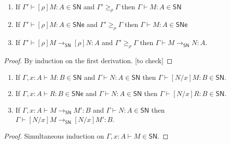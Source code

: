 \documentclass{article}
\newcommand{\ext}[1]{\geq_{#1}}
\newcommand{\SN}{\mathsf{SN}}
\newcommand{\SNe}{\mathsf{SNe}}
\newcommand{\redSN}{\longrightarrow_\SN}
\begin{document}
\begin{lemma}~\label{lm:anti-renameSN}
  \begin{enumerate}
  \item If $\Gamma' \vdash [\rho]M : A \in \SN$ and $\Gamma' \ext{\rho} \Gamma$ then $\Gamma \vdash M : A \in \SN$
  \item If $\Gamma' \vdash [\rho]M : A \in \SNe$ and $\Gamma' \ext{\rho} \Gamma$ then $\Gamma \vdash M : A \in \SNe$
  \item If $\Gamma' \vdash [\rho]M \redSN [\rho]N : A$ and $\Gamma' \ext{\rho} \Gamma$ then $\Gamma \vdash M \redSN N : A$.
  \end{enumerate}
\end{lemma}
\begin{proof}
By induction on the first derivation. [to check]
\end{proof}


\begin{lemma}\label{lem:SNsubst}\quad
  \begin{enumerate}
  \item If $\Gamma, x{:}A \vdash M : B \in \SN$ and $\Gamma \vdash N : A \in \SN$
    then $\Gamma \vdash [N/x]M : B \in \SN$.
  \item If $\Gamma, x{:}A \vdash R : B \in \SNe$ and $\Gamma \vdash N : A \in \SN$
    then $\Gamma \vdash [N/x]R : B \in \SN$.
  \item If $\Gamma, x{:}A \vdash M \redSN M' : B$ and $\Gamma \vdash N : A \in \SN$ then
    $\Gamma \vdash [N/x]M \redSN [N/x]M' : B$.
  \end{enumerate}
\end{lemma}
\begin{proof}
Simultaneous induction on $\Gamma, x{:}A \vdash M \in \SN$.



\end{proof}
\end{document}
